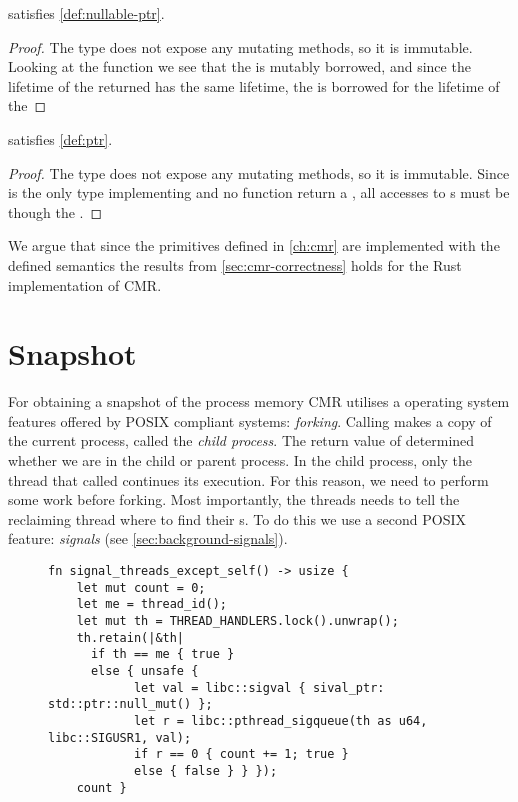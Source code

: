 \begin{claim}
   satisfies \cref{def:nullable-ptr}.
\end{claim}
\begin{proof}
  The type does not expose any mutating methods, so it is immutable.
  Looking at the function  we see that the  is mutably borrowed, and
  since the lifetime of the  returned has the same lifetime, the  is
  borrowed for the lifetime of the 
\end{proof}

\begin{claim}
   satisfies \cref{def:ptr}.
\end{claim}
\begin{proof}
  The type does not expose any mutating methods, so it is immutable.
  Since  is the only type implementing  and no function return a ,
  all accesses to s must be though the .
\end{proof}


We argue that since the primitives defined in \cref{ch:cmr} are implemented with the defined
semantics the results from \cref{sec:cmr-correctness} holds for the Rust implementation of CMR.


\section{Snapshot\label{sec:impl-snapshot}}

For obtaining a snapshot of the process memory CMR utilises a operating system features offered
by POSIX compliant systems: \emph{forking}.
Calling  makes a copy of the current process, called the \emph{child process}.
The return value of  determined whether we are in the child or parent process.
In the child process, only the thread that called  continues its execution. For this
reason, we need to perform some work before forking. Most importantly, the threads needs to tell
the reclaiming thread where to find their s. To do this we use a second POSIX feature:
\emph{signals} (see \cref{sec:background-signals}).

\begin{figure}[ht]
  \begin{lstlisting}[style=Rust,label=lst:thread-signaling,
  caption=Thread signaling,
  ]
fn signal_threads_except_self() -> usize {
    let mut count = 0;
    let me = thread_id();
    let mut th = THREAD_HANDLERS.lock().unwrap();
    th.retain(|&th|
      if th == me { true }
      else { unsafe {
            let val = libc::sigval { sival_ptr: std::ptr::null_mut() };
            let r = libc::pthread_sigqueue(th as u64, libc::SIGUSR1, val);
            if r == 0 { count += 1; true }
            else { false } } });
    count }
\end{lstlisting}
\end{figure}

